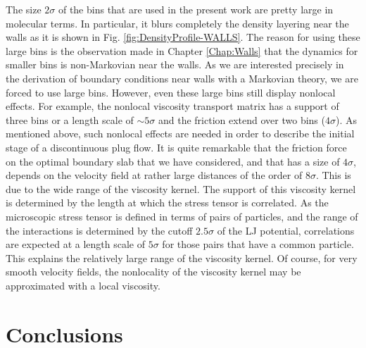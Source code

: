 \documentclass[b5paper,openright,10pt]{book}
\begin{document}
The size $2\sigma$ of  the bins that are used in  the present work are
pretty large in  molecular terms.  In particular,  it blurs completely
the density layering near the walls as it is shown in Fig. \ref{fig:DensityProfile-WALLS}.  The reason for using these large
bins is the observation made in Chapter \ref{Chap:Walls} that the dynamics for smaller
bins is non-Markovian  near the walls. As we  are interested precisely
in the derivation  of boundary conditions near walls  with a Markovian
theory, we  are forced to  use large  bins. However, even  these large
bins  still display  nonlocal  effects.  For  example, the  nonlocal
viscosity transport  matrix has a  support of  three bins or  a length
scale of $\sim 5\sigma$ and the  friction extend over two bins ($4\sigma$).
As  mentioned above,  such nonlocal  effects are  needed in  order to
describe the initial stage of a  discontinuous plug flow.  It is quite
remarkable that the  friction force on the optimal  boundary slab that
we have considered,  and that has a size of  $4\sigma$, depends on the
velocity   field  at   rather  large   distances  of   the  order   of
$8\sigma$. This is  due to the wide range of  the viscosity kernel. 
The support of this viscosity  kernel is determined by the length
at which  the stress tensor  is correlated. As the  microscopic stress
tensor is defined in terms of pairs of particles, and the range of the
interactions  is   determined  by   the  cutoff  $2.5\sigma$   of  the
LJ potential,  correlations are expected at  a length scale
of  $5\sigma$ for  those  pairs  that have  a  common particle.   This
explains  the  relatively large  range  of  the viscosity  kernel.  Of
course,  for very  smooth  velocity fields,  the  nonlocality of  the
viscosity kernel may be approximated with a local viscosity.





\chapter{Conclusions}\label{Chap:Conclusions}
\end{document}
